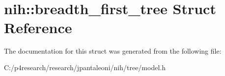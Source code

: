 \hypertarget{structnih_1_1breadth__first__tree}{
\section{nih\-:\-:breadth\-\_\-first\-\_\-tree \-Struct \-Reference}
\label{structnih_1_1breadth__first__tree}
}


\-The documentation for this struct was generated from the following file\-:\begin{DoxyCompactItemize}
\item 
\-C\-:/p4research/research/jpantaleoni/nih/tree/model.\-h\end{DoxyCompactItemize}
